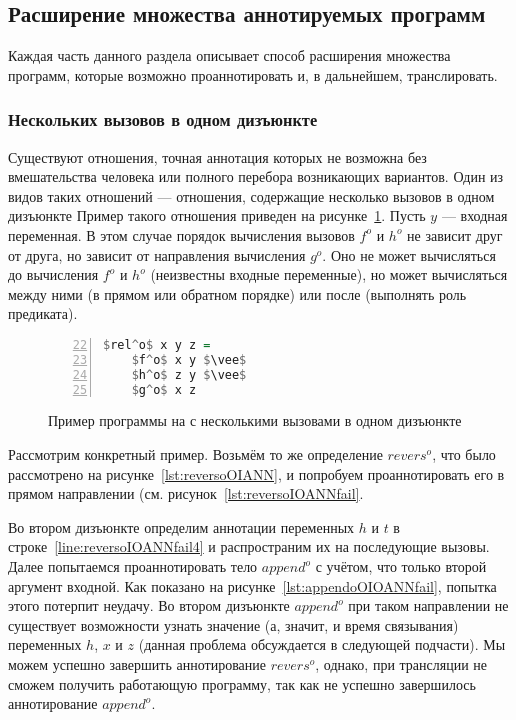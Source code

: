 \subsection{Расширение множества аннотируемых программ}

Каждая часть данного раздела описывает способ расширения множества программ, которые возможно проаннотировать и, в дальнейшем, транслировать.


\subsubsection{Нескольких вызовов в одном дизъюнкте}

Существуют отношения, точная аннотация которых не возможна без вмешательства человека или полного перебора возникающих вариантов. 
Один из видов таких отношений --- отношения, содержащие несколько вызовов в одном дизъюнкте
Пример такого отношения приведен на рисунке~\ref{lst:reloDEF}.
Пусть $y$ --- входная переменная.
В этом случае порядок вычисления вызовов $f^o$ и $h^o$ не зависит друг от друга, но зависит от направления вычисления $g^o$.
Оно не может вычисляться до вычисления $f^o$ и $h^o$ (неизвестны входные переменные), но может вычисляться между ними (в прямом или обратном порядке) или после (выполнять роль предиката).

\begin{figure}[h!]
  \begin{center}
  \begin{minipage}{0.18\textwidth}
  \begin{lstlisting}[language=Haskell, frame=single, numbers=left,numberstyle=\small, firstnumber=22, escapechar=|]
  $rel^o$ x y z =
    $f^o$ x y $\vee$
    $h^o$ z y $\vee$
    $g^o$ x z
    \end{lstlisting}
  \end{minipage}
  \end{center}
  \caption{Пример программы на \miniKanren{} с несколькими вызовами в одном дизъюнкте}
  \label{lst:reloDEF}
\end{figure}

Рассмотрим конкретный пример.
Возьмём то же определение $revers^o$, что было рассмотрено на рисунке~\ref{lst:reversoOIANN}, и попробуем проаннотировать его в прямом направлении (см. рисунок~\ref{lst:reversoIOANNfail}.

Во втором дизъюнкте определим аннотации переменных $h$ и $t$ в строке~\ref{line:reversoIOANNfail4} и распространим их на последующие вызовы.
Далее попытаемся проаннотировать тело $append^o$ с учётом, что только второй аргумент входной.
Как показано на рисунке~\ref{lst:appendoOIOANNfail}, попытка этого потерпит неудачу.
Во втором дизъюнкте $append^o$ при таком направлении не существует возможности узнать значение (а, значит, и время связывания) переменных $h$, $x$ и $z$ (данная проблема обсуждается в следующей подчасти).
Мы можем успешно завершить аннотирование $revers^o$, однако, при трансляции не сможем получить работающую программу, так как не успешно завершилось аннотирование $append^o$. 

